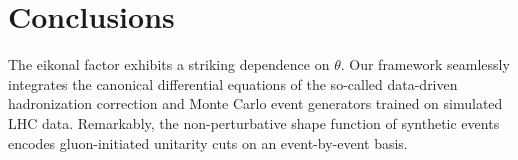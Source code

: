 \section{Conclusions}\label{sec:conclusions}

The eikonal factor exhibits a striking dependence on $\theta$. Our
framework seamlessly integrates the canonical differential equations of
the so-called data-driven hadronization correction and Monte Carlo event
generators trained on simulated LHC data. Remarkably, the
non-perturbative shape function of synthetic events encodes
gluon-initiated unitarity cuts on an event-by-event basis.

